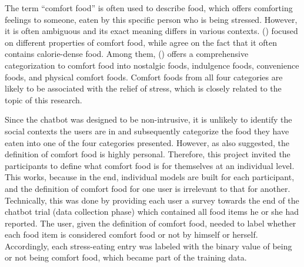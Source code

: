The term “comfort food” is often used to describe food, which offers comforting feelings to someone, eaten by this specific person who is being stressed. However, it is often ambiguous and its exact meaning differs in various contexts. \citeauthor{12_comfort_food_women, 14_comfort_food, 15_comfort_food_review} (\citeyear{12_comfort_food_women, 14_comfort_food, 15_comfort_food_review}) focused on different properties of comfort food, while agree on the fact that it often contains calorie-dense food. Among them, \citeauthor{14_comfort_food} (\citeyear{14_comfort_food}) offers a comprehensive categorization to comfort food into nostalgic foods, indulgence foods, convenience foods, and physical comfort foods. Comfort foods from all four categories are likely to be associated with the relief of stress, which is closely related to the topic of this research.

Since the chatbot was designed to be non-intrusive, it is unlikely to identify the social contexts the users are in and subsequently categorize the food they have eaten into one of the four categories \citeauthor{14_comfort_food} presented. However, as \citeauthor{14_comfort_food} also suggested, the definition of comfort food is highly personal. Therefore, this project invited the participants to define what comfort food is for themselves at an individual level. This works, because in the end, individual models are built for each participant, and the definition of comfort food for one user is irrelevant to that for another. Technically, this was done by providing each user a survey towards the end of the chatbot trial (data collection phase) which contained all food items he or she had reported. The user, given the definition of comfort food, needed to label whether each food item is considered comfort food or not by himself or herself. Accordingly, each stress-eating entry was labeled with the binary value of being or not being comfort food, which became part of the training data.
